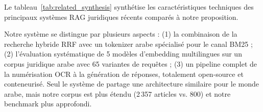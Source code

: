 Le tableau~\ref{tab:related_synthesis} synthétise les caractéristiques
techniques des principaux systèmes RAG juridiques récents comparés à
notre proposition.

\begin{table}[H]
\centering
\caption{Synthèse comparative des systèmes RAG juridiques récents}
\label{tab:related_synthesis}
\renewcommand{\arraystretch}{1.15}
%
\end{table}

\vspace{0.2cm}

\noindent Notre système se distingue par plusieurs aspects : (1) la
combinaison de la recherche hybride RRF avec un tokenizer arabe spécialisé
pour le canal BM25 ; (2) l'évaluation systématique de 5 modèles d'embedding
multilingues sur un corpus juridique arabe avec 65 variantes de requêtes ;
(3) un pipeline complet de la numérisation OCR à la génération de réponses,
totalement open-source et conteneurisé. Seul le système de \cite{elaraby2024legal}
partage une architecture similaire pour le monde arabe, mais notre corpus
est plus étendu (2\,357 articles vs. 800) et notre benchmark plus approfondi.